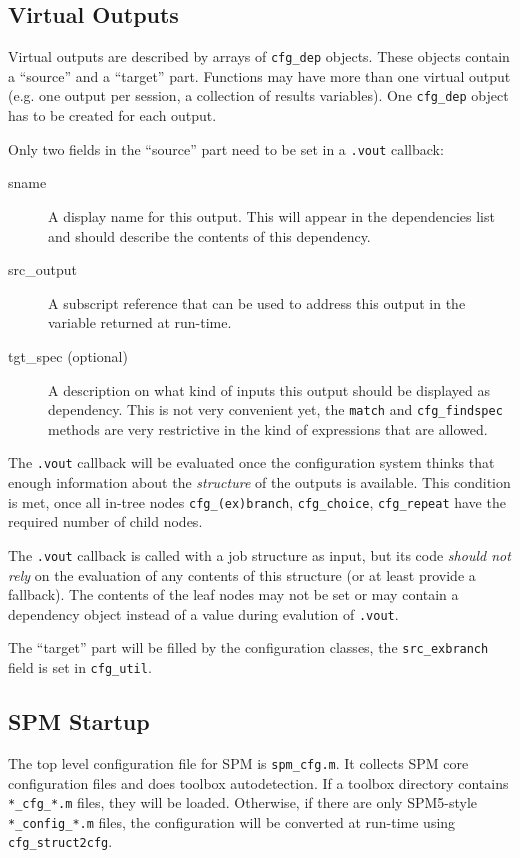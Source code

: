 \subsection{Virtual Outputs}

Virtual outputs are described by arrays of \verb|cfg_dep| objects. These
objects contain a ``source'' and a ``target'' part. Functions may have more
than one virtual output (e.g. one output per session, a collection of results
variables). One \verb|cfg_dep| object has to be created for each output.

Only two fields in the ``source'' part need to be set in a \verb|.vout|
callback: 
\begin{description}
\item[sname] A display name for this output. This will appear in the
  dependencies list and should describe the contents of this dependency.
\item[src\_output] A subscript reference that can be used to address this
  output in the variable returned at run-time.
\item[tgt\_spec (optional)] A description on what kind of inputs this output
  should be displayed as dependency. This is not very convenient yet, the
  \verb|match| and \verb|cfg_findspec| methods are very restrictive in the
  kind of expressions that are allowed.
\end{description}

The \verb|.vout| callback will be evaluated once the configuration system
thinks that enough information about the \emph{structure} of the outputs is
available. This condition is met, once all in-tree nodes
\verb|cfg_(ex)branch|, \verb|cfg_choice|, \verb|cfg_repeat| have the required
number of child nodes. 

The \verb|.vout| callback is called with a job structure as input, but its
code \emph{should not rely} on the evaluation of any contents of this
structure (or at least provide a fallback). The contents of the leaf nodes may
not be set or may contain a dependency object instead of a value during
evalution of \verb|.vout|.

The ``target'' part will be filled by the configuration classes, the
\verb|src_exbranch| field is set in \verb|cfg_util|.

\subsection{SPM Startup}

The top level configuration file for SPM is \verb|spm_cfg.m|. It collects SPM
core configuration files and does toolbox autodetection. If a toolbox
directory contains \verb|*_cfg_*.m| files, they will be loaded. Otherwise, if
there are only SPM5-style \verb|*_config_*.m| files, the configuration will be
converted at run-time using \verb|cfg_struct2cfg|.

